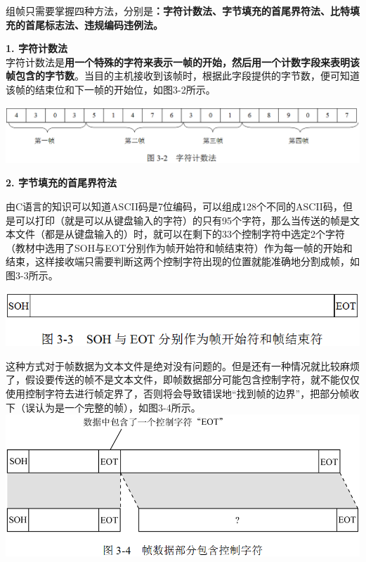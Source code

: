 组帧只需要掌握四种方法，分别是\textbf{：字符计数法、字节填充的首尾界符法、比特填充的首尾标志法、违规编码违例法。}

\textbf{{1. 字符计数法}}\\

字符计数法是\textbf{{用一个特殊的字符来表示一帧的开始，然后用一个计数字段来表明该帧包含的字节数}}。当目的主机接收到该帧时，根据此字段提供的字节数，便可知道该帧的结束位和下一帧的开始位，如图3-2所示。

\includegraphics[width=6in]{png-jpeg-pics/33417908A56A9F2D821F07E23FBD244B.png}

\textbf{{2. 字节填充的首尾界符法}}

由C语言的知识可以知道ASCII码是7位编码，可以组成128个不同的ASCII码，但是可以打印（就是可以从键盘输入的字符）的只有95个字符，那么当传送的帧是文本文件（都是从键盘输入的）时，就可以在剩下的33个控制字符中选定2个字符（教材中选用了SOH与EOT分别作为帧开始符和帧结束符）作为每一帧的开始和结束，这样接收端只需要判断这两个控制字符出现的位置就能准确地分割成帧，如图3-3所示。

\includegraphics[width=6in]{png-jpeg-pics/1DA8665C7083D19C0B49D679D4A326FD.png}

这种方式对于帧数据为文本文件是绝对没有问题的。但是还有一种情况就比较麻烦了，假设要传送的帧不是文本文件，即帧数据部分可能包含控制字符，就不能仅仅使用控制字符去进行帧定界了，否则将会导致错误地``找到帧的边界''，把部分帧收下（误认为是一个完整的帧），如图3-4所示。\\
\includegraphics[width=6in]{png-jpeg-pics/A2D71F83E75A76E0EC484845517030F7.png}

